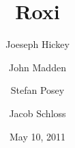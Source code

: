 \documentclass[letterpaper,12pt]{article}
\title{Roxi}
\author{
Joeseph Hickey
\and
John Madden
\and
Stefan Posey
\and
Jacob Schloss
}
\date{May 10, 2011}
\begin{document}
\maketitle
\thispagestyle{empty}
\begin{center}
\end{center}

\newpage
\setcounter{tocdepth}{2}
\tableofcontents

\newpage
\listoffigures
\listoftables

\newpage


\newpage


\newpage


\newpage


\newpage

\end{document}
